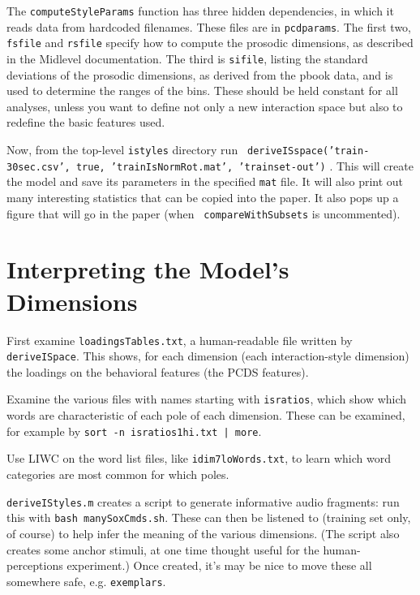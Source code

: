 \documentclass[11pt]{article}
\begin{document}
The {\tt computeStyleParams} function has three hidden dependencies,
in which it reads data from hardcoded filenames.  These files are in
{\tt pcdparams}.  The first two, {\tt fsfile} and {\tt rsfile} specify
how to compute the prosodic dimensions, as described in the Midlevel
documentation. The third is {\tt sifile}, listing the standard
deviations of the prosodic dimensions, as derived from the pbook data,
and is used to determine the ranges of the bins.  These should be held
constant for all analyses, unless you want to define not only a new
interaction space but also to redefine the basic features used.

\medskip
Now, from the top-level {\tt istyles} directory run {\tt
  deriveISspace('train-30sec.csv', true, 'trainIsNormRot.mat',
  'trainset-out')} .  This will create the
model and save its parameters in the specified {\tt mat} file. It will
also print out many interesting statistics that can be copied into the
paper.  It also pops up a figure that will go in the paper (when {\tt
  compareWithSubsets} is uncommented).


\section{Interpreting the Model's Dimensions}

First examine {\tt loadingsTables.txt}, a human-readable file written
by {\tt deriveISpace}.  This shows, for each dimension (each
interaction-style dimension) the loadings on the behavioral features
(the PCDS features).

Examine the various files with names starting with {\tt isratios},
which show which words are characteristic of each pole of each
dimension.  These can be examined, for example by {\tt sort -n
  isratios1hi.txt | more}.  

Use LIWC on the word list files, like {\tt idim7loWords.txt}, to learn
which word categories are most common for which poles.

{\tt deriveIStyles.m} creates a script to generate informative audio
fragments: run this with {\tt bash manySoxCmds.sh}.  These can then be
listened to (training set only, of course) to help infer the meaning
of the various dimensions.  (The script also creates some anchor
stimuli, at one time thought useful for the human-perceptions
experiment.)  Once created, it's may be nice to move these all
somewhere safe, e.g. {\tt exemplars}.
\end{document}
